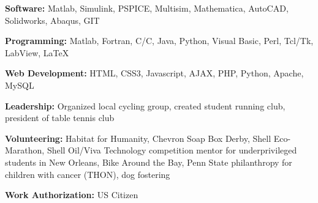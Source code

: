 \documentclass[11pt]{extarticle}
\newcommand{\CC}{C\nolinebreak\hspace{-.05em}\raisebox{.1ex}{\small\bf +}\nolinebreak\hspace{-.10em}\raisebox{.1ex}{\small\bf +}}
\begin{document}

\begin{description}[itemsep=-3pt,leftmargin=30.5pt,itemindent=-2em]
\item[] \textbf{Software:} Matlab, Simulink, PSPICE, Multisim, Mathematica, AutoCAD, Solidworks, Abaqus, GIT%
\item[] \textbf{Programming:} Matlab, Fortran, C/\CC, Java, Python, Visual Basic, Perl, Tcl/Tk, LabView, LaTeX
\item[] \textbf{Web Development:} HTML, CSS3, Javascript, AJAX, PHP, Python, Apache, MySQL
\item[] \textbf{Leadership:} Organized local cycling group, created student running club, president of table tennis club
\item[] \textbf{Volunteering:} Habitat for Humanity, Chevron Soap Box Derby, Shell Eco-Marathon, Shell Oil/Viva Technology competition mentor for underprivileged students in New Orleans, Bike Around the Bay, Penn State philanthropy for children with cancer (THON), dog fostering
\item[] \textbf{Work Authorization:} {US Citizen}
\end{description}
\end{document}
